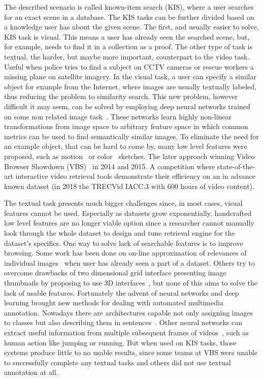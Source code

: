 The described scenario is called known-item search (KIS), where a user searches for an exact scene in a database. The KIS tasks can be further divided based on a knowledge user has about the given scene. The first, and usually easier to solve, KIS task is visual. This means a user has already seen the searched scene, but, for example, needs to find it in a collection as a proof. The other type of task is textual, the harder, but maybe more important, counterpart to the video task. Useful when police tries to find a subject on CCTV cameras or rescue workers a missing plane on satellite imagery. In the visual task, a user can specify a similar object for example from the Internet, where images are usually textually labeled, thus reducing the problem to similarity search. This new problem, however difficult it may seem, can be solved by employing deep neural networks trained on some non related image task~\cite{deepFeatures}. These networks learn highly non-linear transformations from image space to arbitrary feature space in which common metrics can be used to find semantically similar images.
To eliminate the need for an example object, that can be hard to come by, many low level features were proposed, such as motion~\cite{motionSketch} or color~\cite{sigBrowser} sketches. The later approach winning Video Browser Showdown (VBS)~\cite{cobarzan2017interactive} in 2014 and 2015. A competition where state-of-the-art interactive video retrieval tools demonstrate their efficiency on an in advance known dataset (in 2018 the TRECVid IACC.3 with 600 hours of video content).

The textual task presents much bigger challenges since, in most cases, visual features cannot be used. Especially as datasets grow exponentially, handcrafted low level features are no longer viable option since a researcher cannot manually look through the whole dataset to design and tune retrieval engine for the dataset's specifics. One way to solve lack of searchable features is to improve browsing. Some work has been done on on-line approximation of relevances of individual images~\cite{suditu2011heat} when user has already seen a part of a dataset. Others try to overcome drawbacks of two dimensional grid interface presenting image thumbnails by proposing to use 3D interfaces~\cite{schoeffmann20143}, but none of this aims to solve the lack of usable features. Fortunately the advent of neural networks and deep learning brought new methods for dealing with automated multimedia annotation. Nowadays there are architectures capable not only assigning images to classes but also describing them in sentences~\cite{vinyals2017show}. Other neural networks can extract useful information from multiple subsequent frames of videos~\cite{snoek2015qualcomm}, such as human action like jumping or running. But when used on KIS tasks, those systems produce little to no usable results, since some teams at VBS were unable to successfully complete any textual tasks  and others did not use textual annotation at all.

